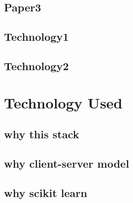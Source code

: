 \subsection{Paper3}
\subsection{Technology1}
\subsection{Technology2}

\section{Technology Used}
\subsection{why this stack}
\subsection{why client-server model}
\subsection{why scikit learn}

\fi


